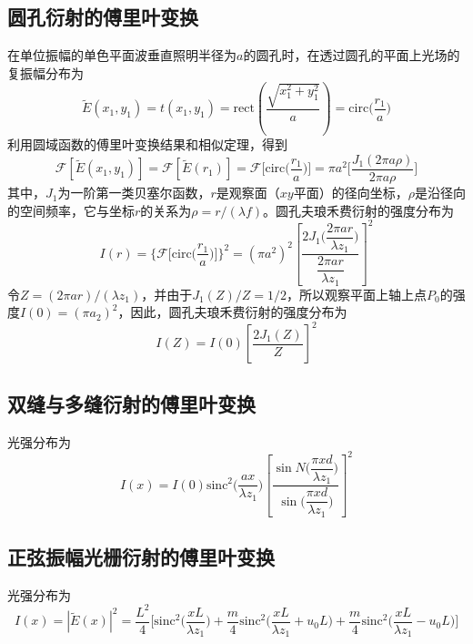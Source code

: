 \documentclass[cn,10pt,chinesefont=founder,math=mtpro2,cite=super,toc=onecol,twoside,openany]{elegantbook}
\begin{document}
\subsection{圆孔衍射的傅里叶变换}

在单位振幅的单色平面波垂直照明半径为$a$的圆孔时，在透过圆孔的平面上光场的复振幅分布为
\begin{equation}
\tilde{E}(x_1,y_1)=t(x_1,y_1)=\mathrm{rect}\left(\frac{\sqrt{x_1^2+y_1^2}}{a}\right)=\mathrm{circ}\bigg(\frac{r_1}{a}\bigg)
\end{equation}
利用圆域函数的傅里叶变换结果和相似定理，得到
\begin{equation}
\mathscr{F}[\tilde{E}(x_1,y_1)]=\mathscr{F}[\tilde{E}(r_1)]=\mathscr{F}\bigg[\mathrm{circ}\bigg(\frac{r_1}{a}\bigg)\bigg]=\pi a^2\bigg[\frac{J_1(2\pi a\rho)}{2\pi a\rho}\bigg]
\end{equation}
其中，$J_1$为一阶第一类贝塞尔函数，$r$是观察面（$xy$平面）的径向坐标，$\rho$是沿径向的空间频率，它与坐标$r$的关系为$\rho=r/(\lambda f)$。圆孔夫琅禾费衍射的强度分布为
\begin{equation}
I(r)=\bigg\{\mathscr{F}\bigg[\mathrm{circ}\bigg(\frac{r_1}{a}\bigg)\bigg]\bigg\}^2=(\pi a^2)^2\left[\frac{2J_1\bigg(\dfrac{2\pi ar}{\lambda z_1}\bigg)}{\dfrac{2\pi ar}{\lambda z_1}}\right]^2
\end{equation}
令$Z=(2\pi ar)/(\lambda z_1)$，并由于$J_1(Z)/Z=1/2$，所以观察平面上轴上点$P_0$的强度$I(0)=(\pi a_2)^2$，因此，圆孔夫琅禾费衍射的强度分布为
\begin{equation}
I(Z)=I(0)\left[\frac{2J_1(Z)}{Z}\right]^2
\end{equation}

\subsection{双缝与多缝衍射的傅里叶变换}

光强分布为
\begin{equation}
I(x)=I(0)\mathrm{sinc}^2\bigg(\frac{ax}{\lambda z_1}\bigg)\left[\frac{\sin N\bigg(\dfrac{\pi xd}{\lambda z_1}\bigg)}{\sin\bigg(\dfrac{\pi xd}{\lambda z_1}\bigg)}\right]^2
\end{equation}

\subsection{正弦振幅光栅衍射的傅里叶变换}

光强分布为
\begin{equation}
I(x)=|\tilde{E}(x)|^2=\frac{L^2}{4}\bigg[\mathrm{sinc}^2\bigg(\frac{xL}{\lambda z_1}\bigg)+\frac{m}{4}\mathrm{sinc}^2\bigg(\frac{xL}{\lambda z_1}+u_0L\bigg)+\frac{m}{4}\mathrm{sinc}^2\bigg(\frac{xL}{\lambda z_1}-u_0L\bigg)\bigg]
\end{equation}
\end{document}
